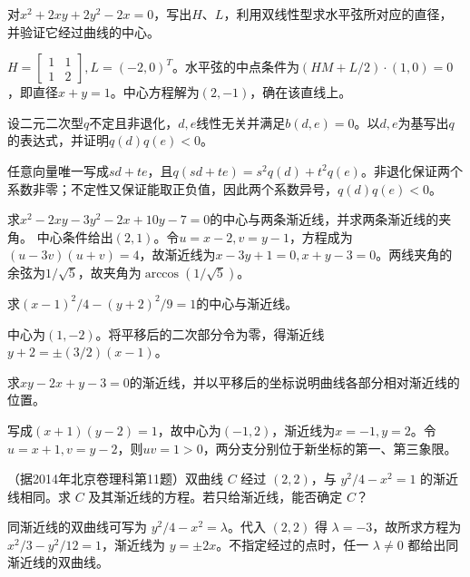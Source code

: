 对\(x^2+2xy+2y^2-2x=0\)，写出\(H\)、\(L\)，利用双线性型求水平弦所对应的直径，并验证它经过曲线的中心。
\par
\solutionanswer
\(H=\begin{bmatrix}1&1\\1&2\end{bmatrix},L=(-2,0)^T\)。水平弦的中点条件为\((HM+L/2)\cdot(1,0)=0\)，即直径\(x+y=1\)。中心方程解为\((2,-1)\)，确在该直线上。


设二元二次型\(q\)不定且非退化，\(d,e\)线性无关并满足\(b(d,e)=0\)。以\(d,e\)为基写出\(q\)的表达式，并证明\(q(d)q(e)<0\)。
\par
\solutionanswer
任意向量唯一写成\(sd+te\)，且\(q(sd+te)=s^2q(d)+t^2q(e)\)。非退化保证两个系数非零；不定性又保证能取正负值，因此两个系数异号，\(q(d)q(e)<0\)。


求\(x^2-2xy-3y^2-2x+10y-7=0\)的中心与两条渐近线，并求两条渐近线的夹角。
\solutionanswer
中心条件给出\((2,1)\)。令\(u=x-2,v=y-1\)，方程成为\((u-3v)(u+v)=4\)，故渐近线为\(x-3y+1=0,x+y-3=0\)。两线夹角的余弦为\(1/\sqrt5\)，故夹角为\(\arccos(1/\sqrt5)\)。


求\((x-1)^2/4-(y+2)^2/9=1\)的中心与渐近线。
\par
\solutionanswer
中心为\((1,-2)\)。将平移后的二次部分令为零，得渐近线\(y+2=\pm(3/2)(x-1)\)。


求\(xy-2x+y-3=0\)的渐近线，并以平移后的坐标说明曲线各部分相对渐近线的位置。
\par
\solutionanswer
写成\((x+1)(y-2)=1\)，故中心为\((-1,2)\)，渐近线为\(x=-1,y=2\)。令\(u=x+1,v=y-2\)，则\(uv=1>0\)，两分支分别位于新坐标的第一、第三象限。


（据2014年北京卷理科第11题）双曲线 \(C\) 经过 \((2,2)\)，与 \(y^2/4-x^2=1\) 的渐近线相同。求 \(C\) 及其渐近线的方程。若只给渐近线，能否确定 \(C\)？
\par
\solutionanswer
同渐近线的双曲线可写为 \(y^2/4-x^2=\lambda\)。代入 \((2,2)\) 得 \(\lambda=-3\)，故所求方程为 \(x^2/3-y^2/12=1\)，渐近线为 \(y=\pm2x\)。不指定经过的点时，任一 \(\lambda\ne0\) 都给出同渐近线的双曲线。


